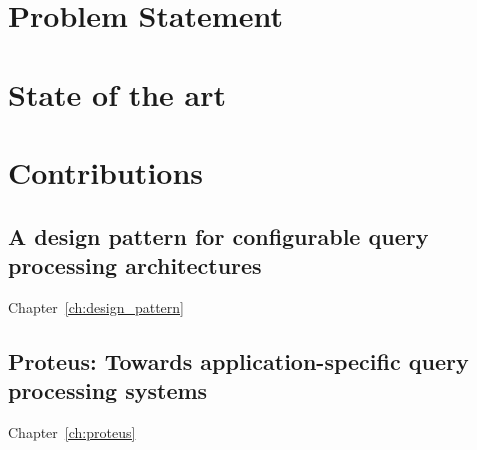 \section{Problem Statement}


\section{State of the art}






\section{Contributions}
\subsection{A design pattern for configurable query processing architectures}
Chapter~\ref{ch:design_pattern}

\subsection{Proteus: Towards application-specific query processing systems}
Chapter~\ref{ch:proteus}
